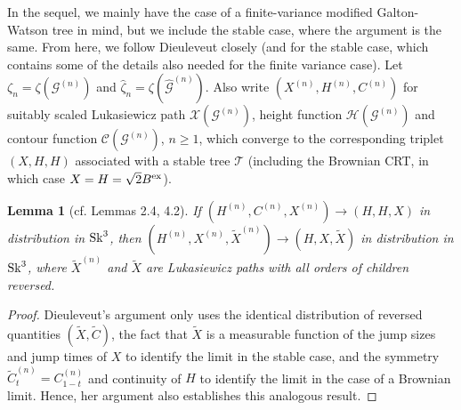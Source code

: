 \documentclass[11pt,a4paper]{article}
\newtheorem{lm}[prop]{Lemma}
\newcommand{\bT}{\mathbb{T}}
\newcommand{\cC}{\mathcal{C}}
\newcommand{\cG}{\mathcal{G}}
\newcommand{\cH}{\mathcal{H}}
\newcommand{\cT}{\mathcal{T}}
\newcommand{\cX}{\mathcal{X}}
\begin{document}
In the sequel, we mainly have the case of a finite-variance modified Galton-Watson tree in mind, but we include the stable case, where the argument is the same. From 
here, we follow Dieuleveut \cite[Section 4]{Die13} closely (and \cite[Section 2]{Die13} for the stable case, which contains some of the details also needed for the 
finite variance case).
Let $\zeta_n=\zeta(\cG^{(n)})$ and $\widehat{\zeta}_n=\zeta(\widehat{\cG}^{(n)})$. Also write 
$(X^{(n)},H^{(n)},C^{(n)})$ for suitably scaled Lukasiewicz path $\cX(\cG^{(n)})$, height function $\cH(\cG^{(n)})$ and contour function $\cC(\cG^{(n)})$, $n\ge 1$, 
which converge to the corresponding triplet $(X,H,H)$ associated with a stable tree $\cT$ (including the Brownian CRT, in which case $X=H=\sqrt{2}B^{\rm ex}$). 
\begin{lm}[cf. \cite{Die13} Lemmas 2.4, 4.2]\label{lmrev} If $(H^{(n)},C^{(n)},X^{(n)})\rightarrow(H,H,X)$ in distribution in ${\rm Sk}^3$, then $(H^{(n)},X^{(n)},\widetilde{X}^{(n)})\rightarrow (H,X,\widetilde{X})$ in distribution in ${\rm Sk}^3$,
  where $\widetilde{X}^{(n)}$ and $\widetilde{X}$ are Lukasiewicz paths with all orders of children reversed.
\end{lm}
\begin{proof} Dieuleveut's argument only uses the identical distribution of reversed quantities $(\widetilde{X},\widetilde{C})$, the fact that $\widetilde{X}$ is a
  measurable function of the jump sizes and jump times of $X$ to identify the limit in the stable case, and the symmetry 
  $\widetilde{C}^{(n)}_t=C^{(n)}_{1-t}$ and continuity of $H$ to identify the limit in the case of a Brownian limit. Hence, her argument also establishes this analogous
  result.
\end{proof}
\end{document}

